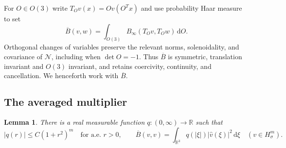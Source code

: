 \documentclass[11pt]{article}
\newtheorem{lemma}[theorem]{Lemma}
\theoremstyle{remark}
\newcommand{\R}{\mathbb R}
\newcommand{\N}{\mathcal N}
\newcommand{\dd}{\,\mathrm d}
\begin{document}
For $O\in O(3)$ write $T_Ov(x)=O v(O^Tx)$ and use probability Haar measure
to set
\begin{equation}
 \overline B(v,w)=\int_{O(3)}B_\infty(T_Ov,T_Ow)\dd O.
 \label{eq:orthogonal-average}
\end{equation}
Orthogonal changes of variables preserve the relevant norms,
solenoidality, and covariance of $\N$, including when $\det O=-1$.
Thus $\overline B$ is symmetric, translation invariant and $O(3)$ invariant,
and retains coercivity, continuity, and cancellation. We henceforth work
with $\overline B$.

\subsection{The averaged multiplier}
\begin{lemma}\label{lem:multiplier}
There is a real measurable function $q:(0,\infty)\to\R$ such that
\begin{equation}
 |q(r)|\le C(1+r^2)^m\quad\text{for a.e. }r>0,
 \qquad
 \overline B(v,v)=\int_{\R^3}q(|\xi|)|\widehat v(\xi)|^2\dd\xi
 \quad(v\in H^m_\sigma).
 \label{eq:radial-multiplier}
\end{equation}
\end{lemma}
\end{document}
